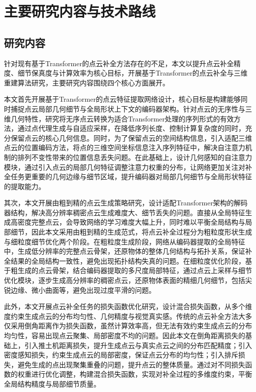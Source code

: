 \section{主要研究内容与技术路线}

\subsection{研究内容}
针对现有基于Transformer的点云补全方法存在的不足，本文以提升点云补全精度、细节保真度与计算效率为核心目标，开展基于Transformer的点云补全与三维重建算法研究，主要研究内容围绕四个核心方面展开。

本文首先开展基于Transformer的点云特征提取网络设计，核心目标是构建能够同时捕捉点云局部几何细节与全局形状上下文的编码器架构。针对点云的无序性与三维几何特性，研究将无序点云转换为适合Transformer处理的序列形式的有效方法，通过点代理生成与自适应采样，在降低序列长度、控制计算复杂度的同时，充分保留点云的核心几何信息。同时，为了保留点云的空间结构信息，引入适配三维点云的位置编码方法，将点的三维空间坐标信息注入序列特征中，解决自注意力机制的排列不变性带来的位置信息丢失问题。在此基础上，设计几何感知的自注意力模块，通过引入点云的局部几何特征调整注意力权重的分布，让网络更加关注对补全任务更重要的几何边缘与细节区域，提升编码器对局部几何细节与全局形状特征的提取能力。

其次，本文开展由粗到精的点云生成策略研究，设计适配Transformer架构的解码器结构，解决高分辨率稠密点云生成难度大、细节丢失的问题。直接从全局特征生成高密度完整点云，会导致网络的学习难度大幅上升，同时难以平衡全局结构与局部细节，因此本文采用由粗到精的生成范式，将点云补全过程分为粗粒度形状生成与细粒度细节优化两个阶段。在粗粒度生成阶段，网络从编码器提取的全局特征中，生成低分辨率的完整点云骨架，还原物体的整体几何结构与拓扑关系，保证补全结果的全局结构一致性，避免出现拓扑结构失真的问题。在细粒度优化阶段，基于粗生成的点云骨架，结合编码器提取的多尺度局部特征，通过点云上采样与细节优化模块，逐步生成高分辨率的稠密点云，还原物体表面的精细几何细节，包括尖锐边缘、微小曲面等，避免出现过度平滑的问题。

此外，本文开展点云补全任务的损失函数优化研究，设计混合损失函数，从多个维度约束生成点云的分布均匀性、几何精度与视觉真实感。传统的点云补全方法大多仅采用倒角距离作为损失函数，虽然计算效率高，但无法有效约束生成点云的分布均匀性，容易出现点云聚集、局部密度不均的问题。因此本文在倒角距离损失的基础上，引入推土机距离损失，提升生成点云与真实点云之间的分布匹配精度；引入密度感知损失，约束生成点云的局部密度，保证点云分布的均匀性；引入排斥损失，避免生成的点出现聚集重叠的问题，提升点云的整体质量。通过对不同损失函数的权重进行优化调整，构建混合损失函数，实现对补全过程的多维度约束，平衡全局结构精度与局部细节质量。

